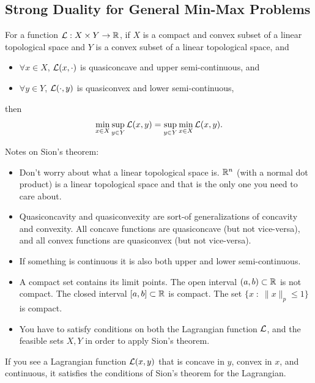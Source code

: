 \documentclass[12pt]{article}
\begin{document}
\subsection{Strong Duality for General Min-Max Problems}

\begin{theorem} 
For a function ${\mathcal L} : X \times Y \to { {\mathbb R}^{} }$, if $X$ is a compact and convex subset of a linear topological space and $Y$ is a convex subset of a linear topological space, and
%
\begin{itemize}
	\item $\forall x \in X$, ${\mathcal L}(x,\cdot)$ is quasiconcave and upper semi-continuous, and 
	\item $\forall y \in Y$, ${\mathcal L}(\cdot,y)$ is quasiconvex and lower semi-continuous, 
\end{itemize}
%
then
%
\begin{equation*}
\min_{x \in X} \sup_{y \in Y} {\mathcal L}(x,y) = \sup_{y\in Y} \min_{x\in X} {\mathcal L}(x,y).
\end{equation*}
\end{theorem}

Notes on Sion's theorem:
%
\begin{itemize}
\item Don't worry about what a linear topological space is. ${ {\mathbb R}^{n} }$ (with a normal dot product) is a linear topological space and that is the only one you need to care about. 
\item Quasiconcavity and quasiconvexity are sort-of generalizations of concavity and convexity. All concave functions are quasiconcave (but not vice-versa), and all convex functions are quasiconvex (but not vice-versa).
\item If something is continuous it is also both upper and lower semi-continuous. 
\item A compact set contains its limit points. The open interval $(a, b) \subset { {\mathbb R}^{} }$ is not compact. The closed interval $[a,b] \subset { {\mathbb R}^{} }$ is compact. The set $\{x \; : \; \|x\|_p \leq 1\}$ is compact.
\item You have to satisfy conditions on both the Lagrangian function ${\mathcal L}$, and the feasible sets $X, Y$ in order to apply Sion's theorem.
\end{itemize}

If you see a Lagrangian function ${\mathcal L}(x,y)$ that is concave in $y$, convex in $x$, and continuous, it satisfies the conditions of Sion's theorem for the Lagrangian. 
\end{document}
